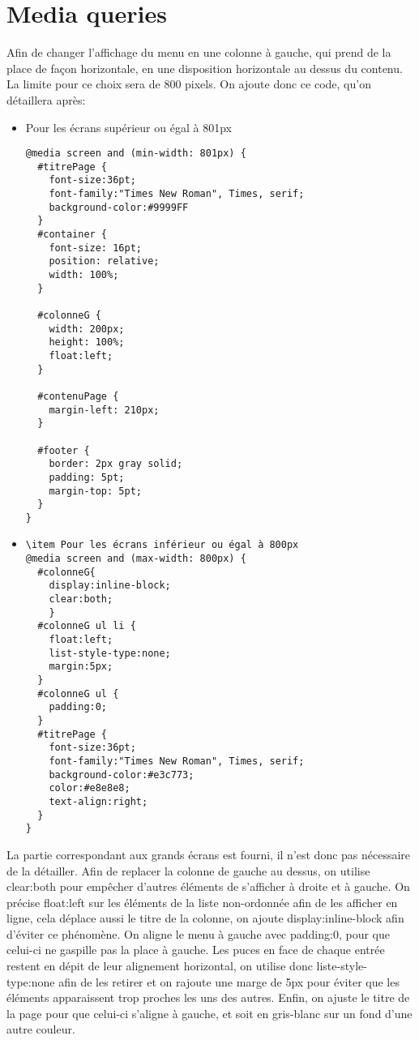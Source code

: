 \section{Media queries} %
Afin de changer l'affichage du menu en une colonne à gauche, qui prend de la place de façon horizontale, en une disposition horizontale au dessus du contenu. La limite pour ce choix sera de 800 pixels.
On ajoute donc ce code, qu'on détaillera après:
\begin{itemize}
\item Pour les écrans supérieur ou égal à 801px
\begin{verbatim}
@media screen and (min-width: 801px) {
  #titrePage {
    font-size:36pt;
    font-family:"Times New Roman", Times, serif;
    background-color:#9999FF
  }
  #container {
    font-size: 16pt;
    position: relative;
    width: 100%;
  }

  #colonneG {
    width: 200px;
    height: 100%;
    float:left;
  }

  #contenuPage {
    margin-left: 210px;
  }

  #footer {
    border: 2px gray solid;
    padding: 5pt;
    margin-top: 5pt;
  }
}
\end{verbatim}

\item
\begin{verbatim}
\item Pour les écrans inférieur ou égal à 800px
@media screen and (max-width: 800px) {
  #colonneG{
    display:inline-block;
    clear:both;
    }
  #colonneG ul li {
    float:left;
    list-style-type:none;
    margin:5px;
  }
  #colonneG ul {
    padding:0;
  }
  #titrePage {
    font-size:36pt;
    font-family:"Times New Roman", Times, serif;
    background-color:#e3c773;
    color:#e8e8e8;
    text-align:right;
  }
}
\end{verbatim}
\end{itemize}
La partie correspondant aux grands écrans est fourni, il n'est donc pas nécessaire de la détailler. Afin de replacer la colonne de gauche au dessus, on utilise clear:both pour empêcher d'autres éléments de s'afficher à droite et à gauche. On précise float:left sur les éléments de la liste non-ordonnée afin de les afficher en ligne, cela déplace aussi le titre de la colonne, on ajoute display:inline-block afin d'éviter ce phénomène. On aligne le menu à gauche avec padding:0, pour que celui-ci ne gaspille pas la place à gauche. Les puces en face de chaque entrée restent en dépit de leur alignement horizontal, on utilise donc liste-style-type:none afin de les retirer et on rajoute une marge de 5px pour éviter que les éléments apparaissent trop proches les uns des autres. Enfin, on ajuste le titre de la page pour que celui-ci s'aligne à gauche, et soit en gris-blanc sur un fond d'une autre couleur.
